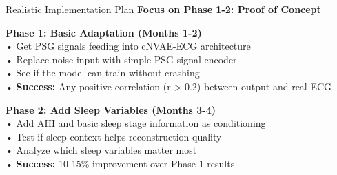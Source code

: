 \documentclass[aspectratio=169,11pt]{beamer}
\begin{document}
\begin{frame}{Realistic Implementation Plan}
  \textbf{\textcolor{tcairemblue}{\Large Focus on Phase 1-2: Proof of Concept}}
  
  \vspace{1em}
  \colorbox{tcairemgreen!15}{\parbox{0.95\textwidth}{
    \large
    \textcolor{tcairemgreen}{\textbf{Phase 1: Basic Adaptation (Months 1-2)}}\\
    \vspace{0.8em}
    \normalsize
    • Get PSG signals feeding into cNVAE-ECG architecture\\
    \vspace{0.3em}
    • Replace noise input with simple PSG signal encoder\\  
    \vspace{0.3em}
    • See if the model can train without crashing\\
    \vspace{0.3em}
    • \textbf{Success:} Any positive correlation (r > 0.2) between output and real ECG
  }}
  
  \vspace{0.8em}
  \colorbox{tcairemorange!15}{\parbox{0.95\textwidth}{
    \large
    \textcolor{tcairemorange}{\textbf{Phase 2: Add Sleep Variables (Months 3-4)}}\\
    \vspace{0.8em}
    \normalsize
    • Add AHI and basic sleep stage information as conditioning\\
    \vspace{0.3em}
    • Test if sleep context helps reconstruction quality\\
    \vspace{0.3em}
    • Analyze which sleep variables matter most\\
    \vspace{0.3em}
    • \textbf{Success:} 10-15\% improvement over Phase 1 results
  }}
  
\end{frame}
\end{document}
